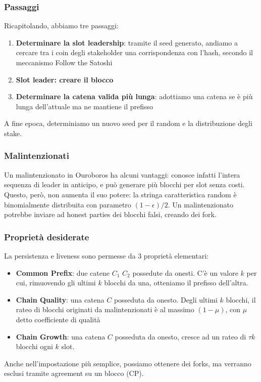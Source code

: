 \documentclass[11pt]{article}
\begin{document}
\subsubsection{Passaggi}
Ricapitolando, abbiamo tre passaggi:
\begin{enumerate}
    \item \textbf{Determinare la slot leadership}: tramite il seed generato, andiamo a cercare tra i coin degli stakeholder una corrispondenza con l'hash, secondo il meccanismo Follow the Satoshi
    \item \textbf{Slot leader: creare il blocco}
    \item \textbf{Determinare la catena valida più lunga}: adottiamo una catena se è più lunga dell'attuale ma ne mantiene il prefisso
\end{enumerate}
A fine epoca, determiniamo un nuovo seed per il random e la distribuzione degli stake.
\subsubsection{Malintenzionati}
 Un malintenzionato in Ouroboros ha alcuni vantaggi: conosce infatti l'intera sequenza di leader in anticipo, e può generare più blocchi per slot senza costi. Questo, però, non aumenta il suo potere: la stringa caratteristica random è binomialmente distribuita con parametro $(1-\epsilon)/2$. Un malintenzionato potrebbe inviare ad honest parties dei blocchi falsi, creando dei fork.
\subsubsection{Proprietà desiderate}
La persistenza e liveness sono permesse da 3 proprietà elementari:
\begin{itemize}
    \item \textbf{Common Prefix}: due catene $C_1$ $C_2$ possedute da onesti. C'è un valore $k$ per cui, rimuovendo gli ultimi $k$ blocchi da una, otteniamo il prefisso dell'altra.
    \item \textbf{Chain Quality}: una catena $C$ posseduta da onesto. Degli ultimi $k$ blocchi, il rateo di blocchi originati da malintenzionati è al massimo $(1-\mu)$, con $\mu$ detto coefficiente di qualità
    \item \textbf{Chain Growth}: una catena $C$ posseduta da onesto, cresce ad un rateo di $\tau k$ blocchi ogni $k$ slot.
\end{itemize}
Anche nell'impostazione più semplice, possiamo ottenere dei forks, ma verranno esclusi tramite agreement su un blocco (CP). 
\end{document}
